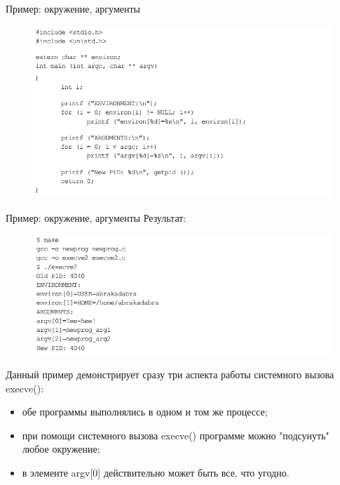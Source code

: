 \documentclass{beamer}
\begin{document}
\begin{frame}{Пример: окружение, аргументы}
\begin{figure}[h]
\centering
\includegraphics[scale=0.5]{images/lec07-pic38.png}
\end{figure}
\end{frame}

\begin{frame}{Пример: окружение, аргументы}
Результат:
\begin{figure}[h]
\centering
\includegraphics[scale=0.5]{images/lec07-pic39.png}
\end{figure}
Данный пример демонстрирует сразу три аспекта работы системного вызова
execve():
\begin{itemize}
\item обе программы выполнялись в одном и том же процессе;
\item при помощи системного вызова execve() программе можно "подсунуть" любое окружение;
\item в элементе argv[0] действительно может быть все, что угодно.
\end{itemize}
\end{frame}
\end{document}
